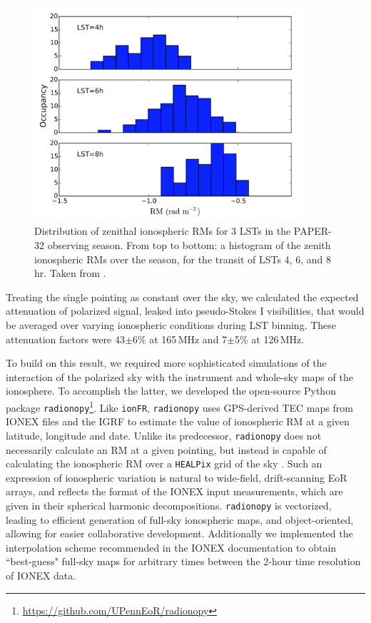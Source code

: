 \begin{figure}
\centering
\includegraphics[width=0.9\textwidth]{chapters/ionosphere/figures/MooreHist.png}
\caption[Distribution of zenithal ionospheric RMs for 3 LSTs in the PAPER-32 observing season]{Distribution of zenithal ionospheric RMs for 3 LSTs in the PAPER-32 observing season. From top to bottom: a histogram of the zenith ionospheric RMs over the season, for the transit of LSTs 4, 6, and 8 hr. Taken from \cite{Moore.17}.}
\label{fig:ionosphere_psa32hist}
\end{figure}

Treating the single pointing as constant over the sky, we calculated the expected attenuation of polarized signal, leaked into pseudo-Stokes I visibilities, that would be averaged over varying ionospheric conditions during LST binning. These attenuation factors were 43$\pm$6\% at 165\,MHz and 7$\pm$5\% at 126\,MHz.

To build on this result, we required more sophisticated simulations of the interaction of the polarized sky with the instrument and whole-sky maps of the ionosphere. To accomplish the latter, we developed the open-source Python package {\tt radionopy}\footnote{\url{https://github.com/UPennEoR/radionopy}}. Like {\tt ionFR}, {\tt radionopy} uses GPS-derived TEC maps from IONEX files and the IGRF to estimate the value of ionospheric RM at a given latitude, longitude and date. Unlike its predecessor, {\tt radionopy} does not necessarily calculate an RM at a given pointing, but instead is capable of calculating the ionospheric RM over a {\tt HEALPix} grid of the sky \citep{Gorski.05}. Such an expression of ionospheric variation is natural to wide-field, drift-scanning EoR arrays, and reflects the format of the IONEX input measurements, which are given in their spherical harmonic decompositions. {\tt radionopy} is vectorized, leading to efficient generation of full-sky ionospheric maps, and object-oriented, allowing for easier collaborative development. Additionally we implemented the interpolation scheme recommended in the IONEX documentation to obtain ``best-guess" full-sky maps for arbitrary times between the 2-hour time resolution of IONEX data. 

